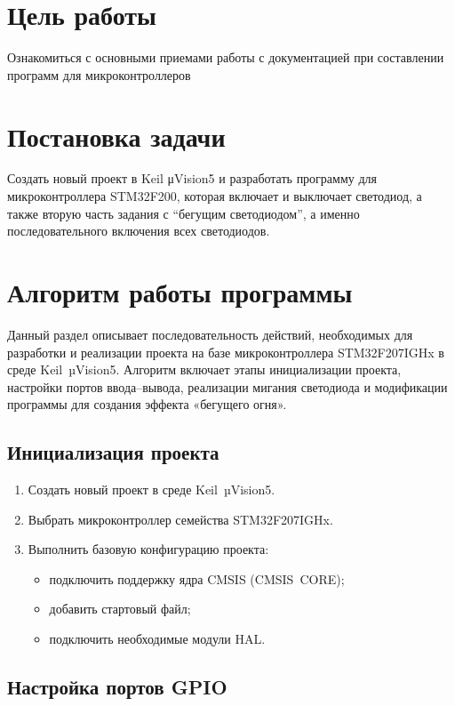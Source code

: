 \section{Цель работы}

Ознакомиться с основными приемами работы с
документацией при составлении программ для микроконтроллеров

\section{Постановка задачи}
Создать новый проект в Keil μVision5 и разработать программу для микроконтроллера STM32F200, которая включает и выключает светодиод, а также вторую часть задания с “бегущим светодиодом”, а именно последовательного включения всех светодиодов.

\section{Алгоритм работы программы}

Данный раздел описывает последовательность действий, необходимых для разработки и реализации проекта на базе микроконтроллера STM32F207IGHx в среде Keil~µVision5. Алгоритм включает этапы инициализации проекта, настройки портов ввода–вывода, реализации мигания светодиода и модификации программы для создания эффекта «бегущего огня».

\subsection{Инициализация проекта}

\begin{enumerate}
  \item Создать новый проект в среде Keil~µVision5.
  \item Выбрать микроконтроллер семейства STM32F207IGHx.
  \item Выполнить базовую конфигурацию проекта:
  \begin{itemize}
      \item подключить поддержку ядра CMSIS (CMSIS~CORE);
      \item добавить стартовый файл;
      \item подключить необходимые модули HAL.
  \end{itemize}
\end{enumerate}

\subsection{Настройка портов GPIO}

